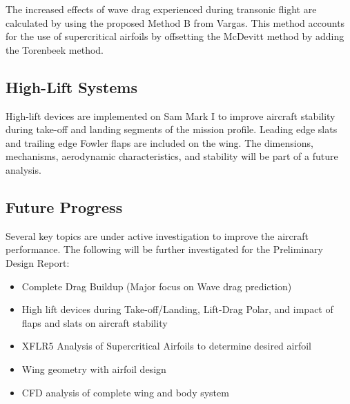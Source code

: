 The increased effects of wave drag experienced during transonic flight are calculated by using the proposed Method B from Vargas.  This method accounts for the use of supercritical airfoils by offsetting the McDevitt method by adding the Torenbeek method.


\subsection{High-Lift Systems}
High-lift devices are implemented on Sam Mark I to improve aircraft stability during take-off and landing segments of the mission profile.  Leading edge slats and trailing edge Fowler flaps are included on the wing.  The dimensions, mechanisms, aerodynamic characteristics, and stability will be part of a future analysis.

\subsection{Future Progress}
Several key topics are under active investigation to improve the aircraft performance. The following will be further investigated for the Preliminary Design Report:
\begin{itemize}
    \item Complete Drag Buildup (Major focus on Wave drag prediction)
    \item High lift devices during Take-off/Landing, Lift-Drag Polar, and impact of flaps and slats on aircraft stability
    \item XFLR5 Analysis of Supercritical Airfoils to determine desired airfoil
    \item Wing geometry with airfoil design
    \item CFD analysis of complete wing and body system
\end{itemize}


